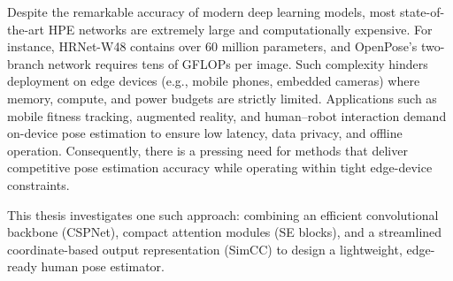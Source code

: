Despite the remarkable accuracy of modern deep learning models, most state-of-the-art HPE networks are extremely large and computationally expensive. For instance, HRNet-W48 contains over 60 million parameters, and OpenPose’s two-branch network requires tens of GFLOPs per image. Such complexity hinders deployment on edge devices (e.g., mobile phones, embedded cameras) where memory, compute, and power budgets are strictly limited. Applications such as mobile fitness tracking, augmented reality, and human–robot interaction demand on-device pose estimation to ensure low latency, data privacy, and offline operation. Consequently, there is a pressing need for methods that deliver competitive pose estimation accuracy while operating within tight edge-device constraints.

This thesis investigates one such approach: combining an efficient convolutional backbone (CSPNet), compact attention modules (SE blocks), and a streamlined coordinate-based output representation (SimCC) to design a lightweight, edge-ready human pose estimator.
